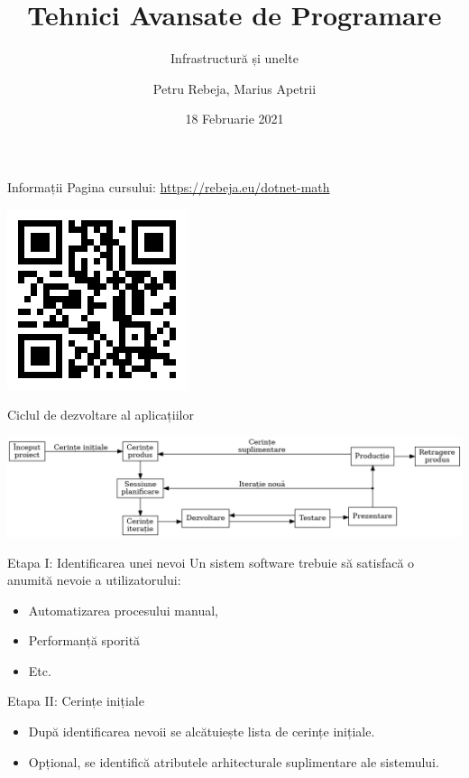 \documentclass[presentation]{beamer}
\author{Petru Rebeja, Marius Apetrii}
\date{18 Februarie 2021}
\title{Tehnici Avansate de Programare}
\subtitle{Infrastructură și unelte}
\institute[UAIC]{Facultatea de Matematică\\Universitatea Alexandru Ioan Cuza, Iași}
\begin{document}
\maketitle
\begin{frame}[label={sec:org1c1b1cc}]{Informații}
Pagina cursului: \url{https://rebeja.eu/dotnet-math}

\begin{center}
\includegraphics[height=0.6\textheight]{img/qr-pagina-curs.png}
\end{center}
\end{frame}
\begin{frame}[label={sec:org2054cdf}]{Ciclul de dezvoltare al aplicațiilor}
\begin{center}
\includegraphics[width=\textwidth]{./img/ciclul-agile.png}
\end{center}
\end{frame}
\begin{frame}[label={sec:org703fcad}]{Etapa I: Identificarea unei nevoi}
Un sistem software trebuie să satisfacă o anumită nevoie a utilizatorului:
\begin{itemize}
\item Automatizarea procesului manual,
\item Performanță sporită
\item Etc.
\end{itemize}
\end{frame}
\begin{frame}[label={sec:org5eebad7}]{Etapa II: Cerințe inițiale}
\begin{itemize}
\item După identificarea nevoii se alcătuiește lista de cerințe inițiale.
\item Opțional, se identifică atributele arhitecturale suplimentare ale sistemului.
\end{itemize}
\end{frame}
\end{document}
